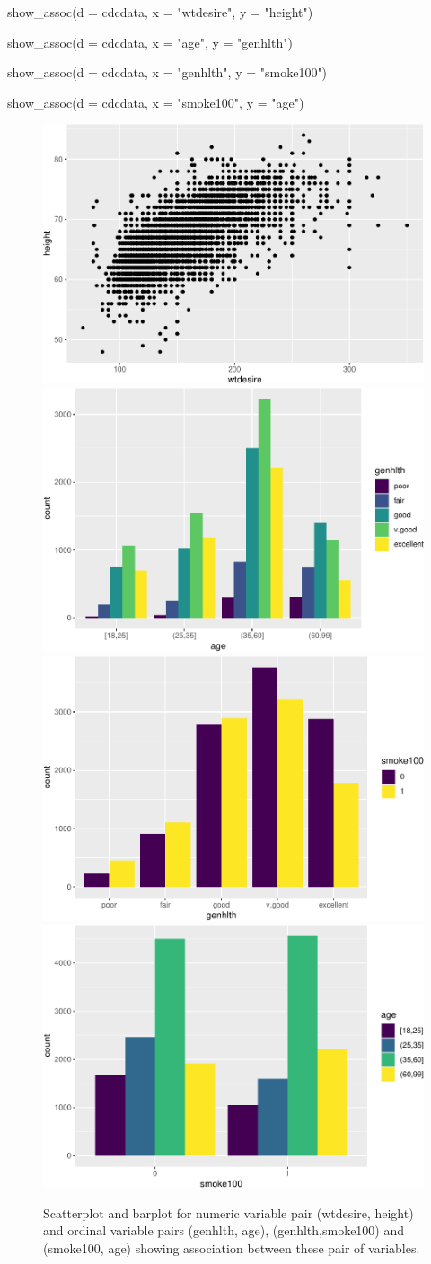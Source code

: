 \begin{Schunk}
\begin{Sinput}
show_assoc(d = cdcdata, 
           x = "wtdesire", 
           y = "height")

show_assoc(d = cdcdata, 
           x = "age", 
           y = "genhlth")

show_assoc(d = cdcdata, 
           x = "genhlth", 
           y = "smoke100")

show_assoc(d = cdcdata, 
           x = "smoke100", 
           y = "age")
\end{Sinput}
\begin{figure}
\includegraphics[width=0.5\linewidth]{rj_paper_files/figure-latex/int-pairs-cdcdata-1} \includegraphics[width=0.5\linewidth]{rj_paper_files/figure-latex/int-pairs-cdcdata-2} \includegraphics[width=0.5\linewidth]{rj_paper_files/figure-latex/int-pairs-cdcdata-3} \includegraphics[width=0.5\linewidth]{rj_paper_files/figure-latex/int-pairs-cdcdata-4} \caption[Scatterplot and barplot for numeric variable pair (wtdesire, height) and ordinal variable pairs (genhlth, age), (genhlth,smoke100) and (smoke100, age) showing association between these pair of variables]{Scatterplot and barplot for numeric variable pair (wtdesire, height) and ordinal variable pairs (genhlth, age), (genhlth,smoke100) and (smoke100, age) showing association between these pair of variables.}\label{fig:int-pairs-cdcdata}

\end{figure}
\end{Schunk}
